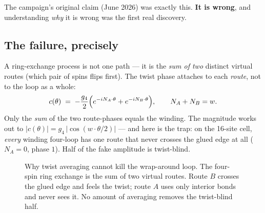\documentclass[11pt,a4paper]{article}
\newcommand{\gfour}{g_4}
\begin{document}
The campaign's original claim (June 2026) was exactly this.  \textbf{It is
wrong}, and understanding \emph{why} it is wrong was the first real
discovery.

\subsection{The failure, precisely}

A ring-exchange process is not one path --- it is the \emph{sum of two}
distinct virtual routes (which pair of spins flips first).  The twist phase
attaches to each \emph{route}, not to the loop as a whole:
\[
c(\theta) \;=\; -\frac{\gfour}{2}\Bigl(e^{-i N_A\cdot\theta} + e^{-i N_B\cdot\theta}\Bigr),
\qquad N_A + N_B = w .
\]
Only the \emph{sum} of the two route-phases equals the winding.  The
magnitude works out to $|c(\theta)| = \gfour\,|\cos(w\cdot\theta/2)|$ --- and
here is the trap: on the 16-site cell, \emph{every} winding four-loop has one
route that never crosses the glued edge at all ($N_A=0$, phase $1$).  Half of
the fake amplitude is twist-blind.

\begin{figure}[h]
\centering
{}
\caption{Why twist averaging cannot kill the wrap-around loop.  The four-spin
ring exchange is the sum of two virtual routes.  Route $B$ crosses the glued
edge and feels the twist; route $A$ uses only interior bonds and never sees
it.  No amount of averaging removes the twist-blind half.}
\label{fig:matchings}
\end{figure}
\end{document}
